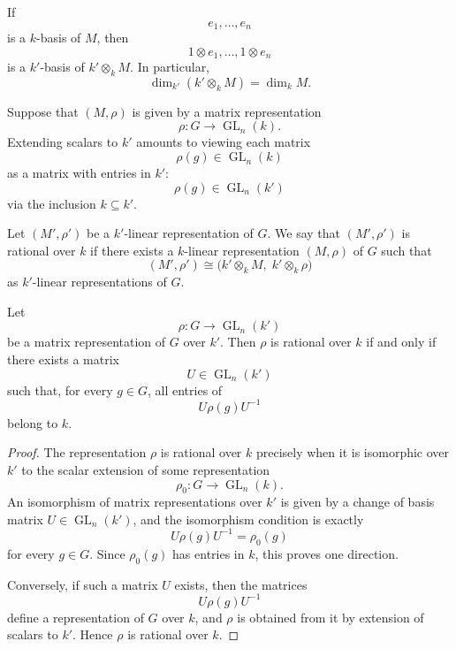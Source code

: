\begin{remark}
    If
    \[
        e_1,\dots,e_n
    \]
    is a \(k\)-basis of \(M\), then
    \[
        1\otimes e_1,\dots,1\otimes e_n
    \]
    is a \(k'\)-basis of \(k'\otimes_k M\). In particular,
    \[
        \dim_{k'}(k'\otimes_k M)=\dim_k M.
    \]
\end{remark}

\begin{remark}
    Suppose that \((M,\rho)\) is given by a matrix representation
    \[
        \rho:G\longrightarrow \operatorname{GL}_n(k).
    \]
    Extending scalars to \(k'\) amounts to viewing each matrix
    \[
        \rho(g)\in \operatorname{GL}_n(k)
    \]
    as a matrix with entries in \(k'\):
    \[
        \rho(g)\in \operatorname{GL}_n(k')
    \]
    via the inclusion \(k\subseteq k'\).
\end{remark}

\begin{definition}
    Let \((M',\rho')\) be a \(k'\)-linear representation of \(G\). We say that
    \((M',\rho')\) is rational over \(k\) if there exists a \(k\)-linear
    representation \((M,\rho)\) of \(G\) such that
    \[
        (M',\rho')
        \cong
        \bigl(k'\otimes_k M,\; k'\otimes_k \rho\bigr)
    \]
    as \(k'\)-linear representations of \(G\).
\end{definition}

\begin{proposition}
    Let
    \[
        \rho:G\longrightarrow \operatorname{GL}_n(k')
    \]
    be a matrix representation of \(G\) over \(k'\). Then \(\rho\) is rational
    over \(k\) if and only if there exists a matrix
    \[
        U\in \operatorname{GL}_n(k')
    \]
    such that, for every \(g\in G\), all entries of
    \[
        U\rho(g)U^{-1}
    \]
    belong to \(k\).
\end{proposition}

\begin{proof}
    The representation \(\rho\) is rational over \(k\) precisely when it is
    isomorphic over \(k'\) to the scalar extension of some representation
    \[
        \rho_0:G\longrightarrow \operatorname{GL}_n(k).
    \]
    An isomorphism of matrix representations over \(k'\) is given by a change of
    basis matrix \(U\in \operatorname{GL}_n(k')\), and the isomorphism condition is
    exactly
    \[
        U\rho(g)U^{-1}=\rho_0(g)
    \]
    for every \(g\in G\). Since \(\rho_0(g)\) has entries in \(k\), this proves one
    direction.

    Conversely, if such a matrix \(U\) exists, then the matrices
    \[
        U\rho(g)U^{-1}
    \]
    define a representation of \(G\) over \(k\), and \(\rho\) is obtained from it by
    extension of scalars to \(k'\). Hence \(\rho\) is rational over \(k\).
\end{proof}

